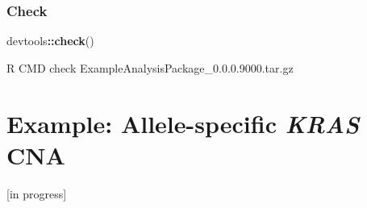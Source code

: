 \documentclass[]{book}
\newenvironment{Shaded}{\begin{snugshade}}{\end{snugshade}}
\newcommand{\ExtensionTok}[1]{#1}
\newcommand{\KeywordTok}[1]{\textcolor[rgb]{0.13,0.29,0.53}{\textbf{#1}}}
\newcommand{\NormalTok}[1]{#1}
\newcommand{\OperatorTok}[1]{\textcolor[rgb]{0.81,0.36,0.00}{\textbf{#1}}}
\begin{document}
\hypertarget{check}{%
\subsection{Check}\label{check}}

\begin{Shaded}
\begin{Highlighting}[]
\NormalTok{devtools}\OperatorTok{::}\KeywordTok{check}\NormalTok{()}
\end{Highlighting}
\end{Shaded}

\begin{Shaded}
\begin{Highlighting}[]
\ExtensionTok{R}\NormalTok{ CMD check ExampleAnalysisPackage_0.0.0.9000.tar.gz}
\end{Highlighting}
\end{Shaded}

\hypertarget{example-allele-specific-kras-cna}{%
\chapter{\texorpdfstring{Example: Allele-specific \emph{KRAS} CNA}{Example: Allele-specific KRAS CNA}}\label{example-allele-specific-kras-cna}}

{[}in progress{]}


\end{document}
